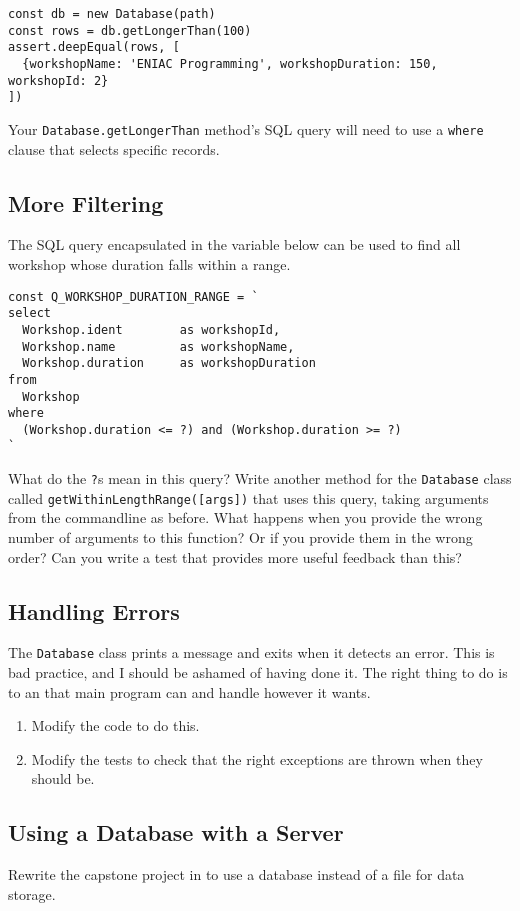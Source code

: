 \begin{verbatim}
const db = new Database(path)
const rows = db.getLongerThan(100)
assert.deepEqual(rows, [
  {workshopName: 'ENIAC Programming', workshopDuration: 150, workshopId: 2}
])
\end{verbatim}

Your \texttt{Database.getLongerThan} method's SQL query
will need to use a \texttt{where} clause
that selects specific records.

\subsection*{More Filtering}
The SQL query encapsulated in the variable below can be used to
find all workshop whose duration falls within a range.

\begin{verbatim}
const Q_WORKSHOP_DURATION_RANGE = `
select
  Workshop.ident        as workshopId,
  Workshop.name         as workshopName,
  Workshop.duration     as workshopDuration
from
  Workshop
where
  (Workshop.duration <= ?) and (Workshop.duration >= ?)
`
\end{verbatim}

What do the \texttt{?}s mean in this query?
Write another method for the \texttt{Database} class called \texttt{getWithinLengthRange({[}args{]})}
that uses this query, taking arguments from the commandline as before.
What happens when you provide the wrong number of arguments to this function? Or
if you provide them in the wrong order?
Can you write a test that provides more useful feedback than this?

\subsection*{Handling Errors}
The \texttt{Database} class prints a message and exits when it detects an error.
This is bad practice,
and I should be ashamed of having done it.
The right thing to do is to 
an 
that main program can 
and handle however it wants.

\begin{enumerate}
\item
  Modify the code to do this.
\item
  Modify the tests to check that the right exceptions are thrown when they should be.
\end{enumerate}

\subsection*{Using a Database with a Server}
Rewrite the capstone project in  to use a database instead of a file for data storage.
